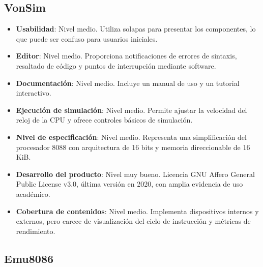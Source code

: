 \documentclass[12pt,oneside]{templates/unerthesis}
\providecommand{\tightlist}{%
  \setlength{\itemsep}{0pt}\setlength{\parskip}{0pt}}
\begin{document}
\hypertarget{vonsim}{%
\subsection{VonSim}\label{vonsim}}

\begin{itemize}
\tightlist
\item
  \textbf{Usabilidad}: Nivel medio. Utiliza solapas para presentar los componentes, lo que puede ser confuso para usuarios iniciales.
\item
  \textbf{Editor}: Nivel medio. Proporciona notificaciones de errores de sintaxis, resaltado de código y puntos de interrupción mediante software.
\item
  \textbf{Documentación}: Nivel medio. Incluye un manual de uso y un tutorial interactivo.
\item
  \textbf{Ejecución de simulación}: Nivel medio. Permite ajustar la velocidad del reloj de la CPU y ofrece controles básicos de simulación.
\item
  \textbf{Nivel de especificación}: Nivel medio. Representa una simplificación del procesador 8088 con arquitectura de 16 bits y memoria direccionable de 16 KiB.
\item
  \textbf{Desarrollo del producto}: Nivel muy bueno. Licencia GNU Affero General Public License v3.0, última versión en 2020, con amplia evidencia de uso académico.
\item
  \textbf{Cobertura de contenidos}: Nivel medio. Implementa dispositivos internos y externos, pero carece de visualización del ciclo de instrucción y métricas de rendimiento.
\end{itemize}

\hypertarget{emu8086}{%
\subsection{Emu8086}\label{emu8086}}
\end{document}
